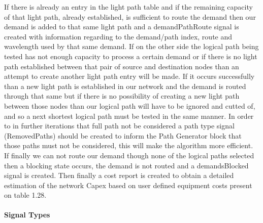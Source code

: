 If there is already an entry in the light path table and if the remaining capacity of that light path, already established, is sufficient to route the demand then our demand is added to that same light path and a demandPathRoute signal is created with information regarding to the demand/path index, route and wavelength used by that same demand. If on the other side the logical path being tested has not enough capacity to process a certain demand or if there is no light path established between that pair of source and destination nodes than an attempt to create another light path entry will be made. If it occurs successfully than a new light path is established in our network and the demand is routed through that same but if there is no possibility of creating a new light path between those nodes than our logical path will have to be ignored and cutted of, and so a next shortest logical path must be tested in the same manner. In order to in further iterations that full path not be considered a path type signal (RemovedPaths) should be created to inform the Path Generator block that those paths must not be considered, this will make the algorithm more efficient. If finally we can not route our demand though none of the logical paths selected then a blocking state occurs, the demand is not routed and a demandsBlocked signal is created. Then finally a cost report is created to obtain a detailed estimation of the network Capex based on user defined equipment costs present on table 1.28.\\ \\



\clearpage
\textbf{Signal Types}

